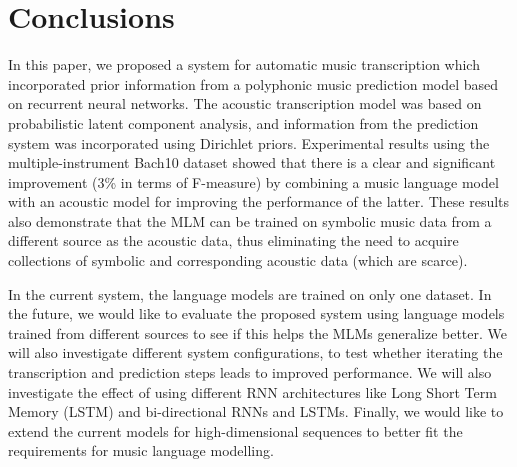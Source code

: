 \section{Conclusions} \label{sec:conclusions}

In this paper, we proposed a system for automatic music transcription which incorporated prior information from a polyphonic music prediction model based on recurrent neural networks. The acoustic transcription model was based on probabilistic latent component analysis, and information from the prediction system was incorporated using Dirichlet priors. Experimental results using the multiple-instrument Bach10 dataset showed that there is a clear and significant improvement (3\% in terms of F-measure) by combining a music language model with an acoustic model for improving the performance of the latter. These results also demonstrate that the MLM can be trained on symbolic music data from a different source as the acoustic data, thus eliminating the need to acquire collections of symbolic and corresponding acoustic data (which are scarce).

In the current system, the language models are trained  on only one dataset. In the future, we would like to evaluate the proposed system using language models trained from different sources to see if this helps the MLMs generalize better. We will also investigate different system configurations, to test whether iterating the transcription and prediction steps leads to improved performance. We will also investigate the effect of using different RNN architectures like Long Short Term Memory (LSTM) and bi-directional RNNs and LSTMs. Finally, we would like to extend the current models for high-dimensional sequences to better fit the requirements for music language modelling. 